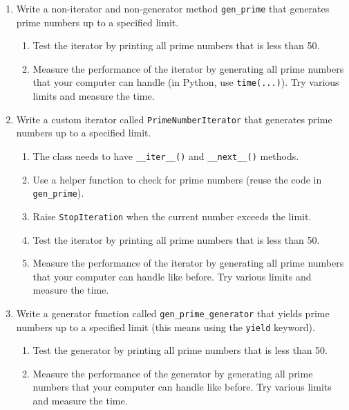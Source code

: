\documentclass[oneside,11pt,dvipsnames]{book}
\newcommand{\code}[1]{\texttt{#1}}
\begin{document}
\begin{enumerate}
    
    \item Write a non-iterator and non-generator method \code{gen\_prime} that generates prime numbers up to a specified limit.
    \begin{enumerate}
    \item Test the iterator by printing all prime numbers that is less than 50.
    \item Measure the performance of the iterator by generating all prime numbers that your computer can handle (in Python, use \code{time(...)}).  Try various limits and measure the time.
    \end{enumerate}

\item Write a custom iterator called \code{PrimeNumberIterator} that generates prime numbers up to a specified limit.
\begin{enumerate}
    \item The class needs to have \code{\_\_iter\_\_()} and \code{\_\_next\_\_()} methods.
    \item Use a helper function to check for prime numbers (reuse the code in \code{gen\_prime}).
    \item Raise \code{StopIteration} when the current number exceeds the limit.
    \item Test the iterator by printing all prime numbers that is less than 50.
    \item Measure the performance of the iterator by generating all prime numbers that your computer can handle like before.  Try various limits and measure the time.
\end{enumerate}
\item Write a generator function called \code{gen\_prime\_generator} that yields prime numbers up to a specified limit (this means using the \code{yield} keyword).
\begin{enumerate}
    \item Test the generator by printing all prime numbers that is less than 50.
    \item Measure the performance of the generator by generating all prime numbers that your computer can handle like before.  Try various limits and measure the time.
\end{enumerate}
\end{enumerate}

\end{document}
